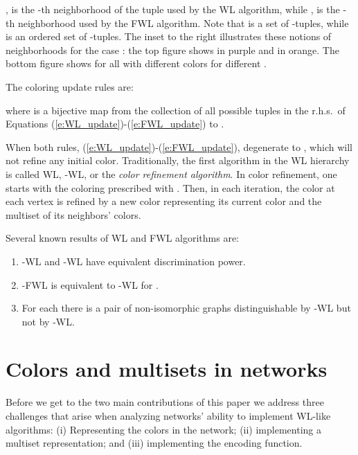 \documentclass{article}
\def\plaineqref#1{\ref{#1}}
\begin{document}
,  is the -th neighborhood of the tuple  used by the WL algorithm, while ,  is the -th neighborhood used by the FWL algorithm. Note that  is a set of  -tuples, while  is an ordered set of   -tuples. The inset to the right illustrates these notions of neighborhoods for the case : the top figure shows  in purple and  in orange. The bottom figure shows  for all  with different colors for different .



The coloring update rules are:

where  is a bijective map from the collection of all possible tuples in the r.h.s.~of  Equations (\plaineqref{e:WL_update})-(\plaineqref{e:FWL_update}) to . 

When  both rules, (\plaineqref{e:WL_update})-(\plaineqref{e:FWL_update}), degenerate to , which will not refine any initial color. Traditionally, the first algorithm in the WL hierarchy is called WL, -WL, or the \emph{color refinement algorithm}. In color refinement, one starts with the coloring prescribed with . Then, in each iteration, the color at each vertex is refined by a new color representing its current color and the multiset of its neighbors' colors. 

Several known results of WL and FWL algorithms \citep{cai1992optimal,grohe2017descriptive,morris2018weisfeiler,grohe2015pebble} are:
\begin{enumerate}
    \item -WL and -WL have equivalent discrimination power. 
    \item -FWL is equivalent to -WL for .
    \item For each  there is a pair of non-isomorphic graphs distinguishable by -WL but not by -WL. \vspace{-3pt}
\end{enumerate}

\section{Colors and multisets in networks}\label{s:colors_and_multisets}
\vspace{-5pt}
Before we get to the two main contributions of this paper we address three challenges that arise when analyzing networks' ability to implement WL-like algorithms: (i) Representing the colors  in the network; (ii) implementing a multiset representation; and  (iii) implementing the encoding function. 

\vspace{-3pt}
\end{document}
